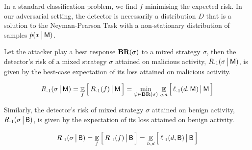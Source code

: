 In a standard classification problem, we find $f$ minimising the expected risk. In our adversarial setting, the detector is necessarily a distribution $D$ that is a solution to the Neyman-Pearson Task with a non-stationary distribution of samples $\dot{p}(x \,\big|\, \mathsf{M})$.

\begin{proposition}
    Let the attacker play a best response $\textbf{BR}(\sigma)$ to a mixed strategy $\sigma$, then the detector's risk of a mixed strategy $\sigma$ attained on malicious activity, $R_{{\text{-}1}}(\sigma \,\big|\, \mathsf{M})$, is given by the best-case expectation of its loss attained on malicious activity.

    \begin{align*}
        R_{{\text{-}1}}(\sigma \,\big|\, \mathsf{M}) = \mathop{\mathbb{E}}_f \Big[\, R_{{\text{-}1}}(f) \,\big|\, \mathsf{M} \,\Big] = \min_{\psi \in \textbf{BR}(\sigma) } \,
            \mathop{\mathbb{E}}_{q, d} \Big[\, \ell_{{\text{-}1}} (d, \mathsf{M}) \,\big|\, \mathsf{M} \,\Big]
    \end{align*}

    Similarly, the detector's risk of mixed strategy $\sigma$ attained on benign activity, $R_{{\text{-}1}}(\sigma \,\big|\, \mathsf{B})$, is given by the expectation of its loss attained on benign activity.

    \begin{align*}
        R_{{\text{-}1}}(\sigma \,\big|\, \mathsf{B}) = \mathop{\mathbb{E}}_f \Big[\, R_{{\text{-}1}}(f) \,\big|\, \mathsf{B} \,\Big] =
            \mathop{\mathbb{E}}_{h, d} \Big[\, \ell_{{\text{-}1}} (d, \mathsf{B}) \,\big|\, \mathsf{B} \,\Big]
    \end{align*}

\end{proposition}

